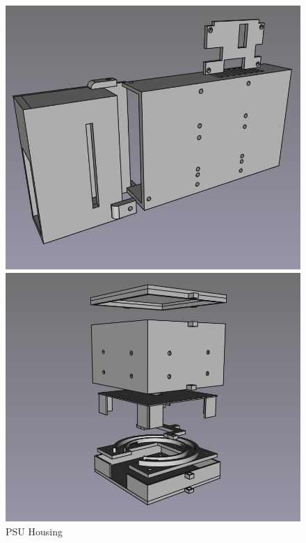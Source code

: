 \begin{figure}
    \begin{minipage}[t]{0.32\textwidth}
      \centering
      \includegraphics[width=\textwidth]{imgs/freecad/psu_mount.jpg}
      \caption{PSU Housing}
    \end{minipage}
    \hfill
    \begin{minipage}[t]{0.32\textwidth}
      \centering
      \includegraphics[width=\textwidth]{imgs/freecad/camera_case.jpg}

\end{minipage}
\end{figure}
